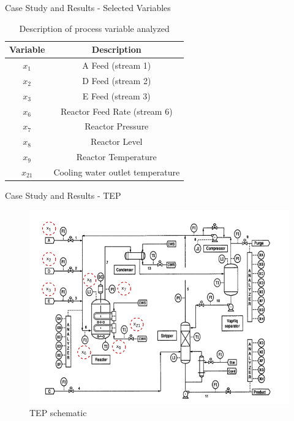 \begin{frame}{Case Study and Results - Selected Variables}
\small
    \begin{table}[!h]
    \renewcommand{\arraystretch}{1.3}
    \centering
    \begin{tabular}{|c|c|}
    \hline
    \textbf{Variable} & \textbf{Description}  \\ 
    \hline
    $\mathit{x_1}$ &  A Feed ({stream 1})  \\
    \hline
    $\mathit{x_2}$ & D Feed ({stream 2}) \\
    \hline
    $\mathit{x_3}$ & E Feed ({stream 3})\\
     \hline
    $\mathit{x_6}$ &  Reactor Feed Rate (stream 6) \\
    \hline
    $\mathit{x_7}$ &  Reactor Pressure \\
    \hline
    $\mathit{x_8}$ & Reactor Level \\
    \hline
    $\mathit{x_9}$ & Reactor Temperature \\
    \hline
    $\mathit{x_{21}}$ & Cooling water  outlet temperature \\
    \hline
    \end{tabular}
    \caption{Description of process variable analyzed}
    \label{tab:varDescript}
\end{table}
\end{frame}


\begin{frame}{Case Study and Results - TEP}

\begin{figure}[!h]
    \centering
    \includegraphics[keepaspectratio, width=\textwidth,height=0.7\textheight]{figuras/tep_inteiro.png}
    \caption{TEP schematic}
    \label{fig:tep}
\end{figure}
    
\end{frame}

